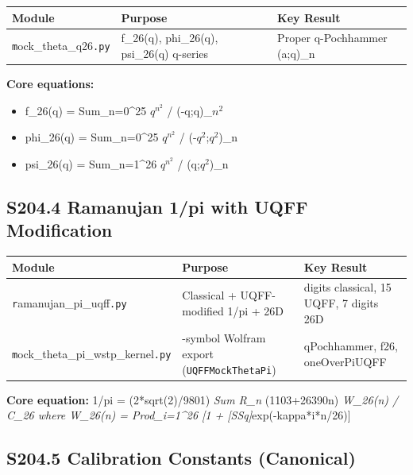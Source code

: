 \documentclass[12pt,a4paper]{article}
\begin{document}
\begin{table}[H]
\centering
\small
\begin{tabularx}{\linewidth}{@{}>{\raggedright\arraybackslash}X>{\raggedright\arraybackslash}X>{\raggedright\arraybackslash}X@{}}
\toprule
Module & Purpose & Key Result \tabularnewline
\midrule
\texttt{m}ock\_{theta\_q26}\texttt{.py} & f\_26(q), phi\_26(q), psi\_26(q) q-series & Proper q-Pochhammer (a;q)\_n \tabularnewline
\bottomrule
\end{tabularx}
\end{table}

\textbf{Core equations:}

\begin{itemize}
  \item f\_26(q) = Sum\_{n=0}\^{}{25} $q^{n^2}$ / (-q;q)\_$n^{2}$
  \item phi\_26(q) = Sum\_{n=0}\^{}{25} $q^{n^2}$ / (-$q^{2}$;$q^{2}$)\_n
  \item psi\_26(q) = Sum\_{n=1}\^{}{26} $q^{n^2}$ / (q;$q^{2}$)\_n
\end{itemize}

\subsection{S204.4 Ramanujan 1/pi with UQFF Modification}

\begin{table}[H]
\centering
\small
\begin{tabularx}{\linewidth}{@{}>{\raggedright\arraybackslash}X>{\raggedright\arraybackslash}X>{\raggedright\arraybackslash}X@{}}
\toprule
Module & Purpose & Key Result \tabularnewline
\midrule
\texttt{r}amanujan\_{pi\_uqff}\texttt{.py} & Classical + UQFF-modified 1/pi + 26D & 21 digits classical, 15 UQFF, 7 digits 26D \tabularnewline
\texttt{m}ock\_{theta\_pi\_wstp\_kernel}\texttt{.py} & 9-symbol Wolfram export (\texttt{UQFFMockThetaPi}) & qPochhammer, f26, oneOverPiUQFF \tabularnewline
\bottomrule
\end{tabularx}
\end{table}

\textbf{Core equation:} 1/pi = (2*sqrt(2)/9801) \emph{ Sum R\_n } (1103+26390n) \emph{ W\_26(n) / C\_26 where W\_26(n) = Prod\_{i=1}\^{}{26} [1 + [SSq]}exp(-kappa*i*n/26)]

\subsection{S204.5 Calibration Constants (Canonical)}
\end{document}
